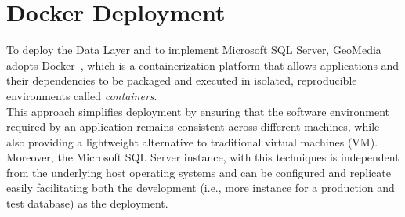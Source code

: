 

\section{Docker Deployment}

To deploy the Data Layer and to implement Microsoft SQL Server, GeoMedia adopts Docker~\cite{site:docker-official}, which is a containerization platform that allows applications and their dependencies to be packaged and executed in isolated, reproducible environments called \textit{containers}. \\
This approach simplifies deployment by ensuring that the software environment required by an application remains consistent across different machines, while also providing a lightweight alternative to traditional virtual machines (VM). Moreover, the Microsoft SQL Server instance, with this techniques is independent from the underlying host operating systems and can be configured and replicate easily facilitating both the development (i.e., more instance for a production and test database) as the deployment.

